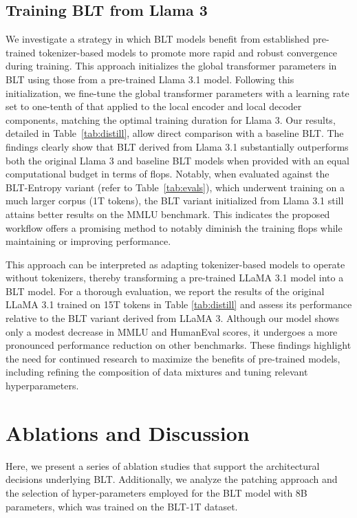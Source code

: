 \subsection{Training {\textsc BLT} from Llama 3}
\label{sec:distillation}
We investigate a strategy in which {\textsc BLT} models benefit from established pre-trained tokenizer-based models to promote more rapid and robust convergence during training. This approach initializes the global transformer parameters in {\textsc BLT} using those from a pre-trained Llama 3.1 model. Following this initialization, we fine-tune the global transformer parameters with a learning rate set to one-tenth of that applied to the local encoder and local decoder components, matching the optimal training duration for Llama 3. Our results, detailed in Table~\ref{tab:distill}, allow direct comparison with a baseline {\textsc BLT}. The findings clearly show that {\textsc BLT} derived from Llama 3.1 substantially outperforms both the original Llama 3 and baseline {\textsc BLT} models when provided with an equal computational budget in terms of flops. Notably, when evaluated against the {\textsc BLT}-Entropy variant (refer to Table~\ref{tab:evals}), which underwent training on a much larger corpus (1T tokens), the {\textsc BLT} variant initialized from Llama 3.1 still attains better results on the MMLU benchmark. This indicates the proposed workflow offers a promising method to notably diminish the training flops while maintaining or improving performance.

This approach can be interpreted as adapting tokenizer-based models to operate without tokenizers, thereby transforming a pre-trained LLaMA 3.1 model into a {\textsc BLT} model. For a thorough evaluation, we report the results of the original LLaMA 3.1 trained on 15T tokens in Table \ref{tab:distill} and assess its performance relative to the {\textsc BLT} variant derived from LLaMA 3. Although our model shows only a modest decrease in MMLU and HumanEval scores, it undergoes a more pronounced performance reduction on other benchmarks. These findings highlight the need for continued research to maximize the benefits of pre-trained models, including refining the composition of data mixtures and tuning relevant hyperparameters.

\section{Ablations and Discussion}
\label{section:ablations}
Here, we present a series of ablation studies that support the architectural decisions underlying {\textsc BLT}. Additionally, we analyze the patching approach and the selection of hyper-parameters employed for the {\textsc BLT} model with 8B parameters, which was trained on the {\textsc BLT}-1T dataset.

